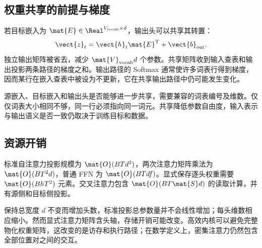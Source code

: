 \documentclass[../textbook.tex]{subfiles}
\begin{document}
\subsection{权重共享的前提与梯度}
若目标嵌入为 $\mat{E}\in\Real^{V_{\mathrm{vocab}}\times d}$，输出头可以共享其转置：
\begin{equation}
 \vect{z}_t=\vect{h}_t\mat{E}^{\mathrm{T}}+\vect{b}_{\mathrm{out}}.
\end{equation}
独立输出矩阵被省去，减少 $\mat{V}_{\mathrm{vocab}}d$ 个参数。共享矩阵收到输入查表和输出投影两条路径的梯度之和。输出路径的 Softmax 通常使许多词表行得到梯度，因而某行在嵌入查表中被设为不更新，它在共享输出路径中仍可能发生变化。

源嵌入、目标嵌入和输出头是否能够进一步共享，需要兼容的词表编号及维数。仅仅词表大小相同不够，同一行必须指向同一词元。共享降低参数自由度，输入表示与输出语义是否一致仍取决于训练目标和数据。

\subsection{资源开销}
标准自注意力投影规模为 $\mat{O}(BTd^2)$，两次注意力矩阵乘法为 $\mat{O}(BT^2d)$，普通 FFN 为 $\mat{O}(BTdf)$。显式保存逐头权重需要 $\mat{O}(BhT^2)$ 元素。交叉注意力包含 $\mat{O}(BT\mat{S}d)$ 的读取计算，并有源侧和目标侧投影。

保持总宽度 $d$ 不变而增加头数，标准投影总参数量并不会线性增加；每头维数相应缩小。然而显式注意力矩阵含头轴，存储开销可能改变。高效内核可以避免完整物化权重矩阵，这改变的是访存和执行路径；在数学定义上，密集注意力仍然包含全部位置对之间的交互。
\end{document}
